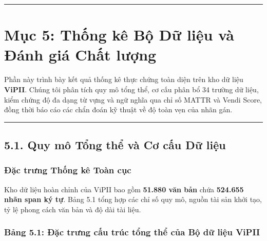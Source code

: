\documentclass[
  11pt,
  a4paper,
]{article}
\begin{document}
\begin{center}\rule{0.5\linewidth}{0.5pt}\end{center}

\section{Mục 5: Thống kê Bộ Dữ liệu và Đánh giá Chất
lượng}\label{mux1ee5c-5-thux1ed1ng-kuxea-bux1ed9-dux1eef-liux1ec7u-vuxe0-ux111uxe1nh-giuxe1-chux1ea5t-lux1b0ux1ee3ng}

Phần này trình bày kết quả thống kê thực chứng toàn diện trên kho dữ liệu \textbf{ViPII}. Chúng tôi
phân tích quy mô tổng thể, cơ cấu phân bổ 34 trường dữ liệu, kiểm chứng độ đa dạng từ vựng và ngữ
nghĩa qua chỉ số MATTR và Vendi Score, đồng thời báo cáo các chẩn đoán kỹ thuật về độ toàn vẹn của
nhãn gán.

\begin{center}\rule{0.5\linewidth}{0.5pt}\end{center}

\subsection{5.1. Quy mô Tổng thể và Cơ cấu Dữ
liệu}\label{quy-muxf4-tux1ed5ng-thux1ec3-vuxe0-cux1a1-cux1ea5u-dux1eef-liux1ec7u}

\subsubsection{Đặc trưng Thống kê Toàn
cục}\label{ux111ux1eb7c-trux1b0ng-thux1ed1ng-kuxea-touxe0n-cux1ee5c}

Kho dữ liệu hoàn chỉnh của ViPII bao gồm \textbf{51.880 văn bản} chứa \textbf{524.655 nhãn span ký
tự}. Bảng 5.1 tổng hợp các chỉ số quy mô, nguồn tài sản khởi tạo, tỷ lệ phong cách văn bản và độ dài
tài liệu.

\subsubsection{Bảng 5.1: Đặc trưng cấu trúc tổng thể của Bộ dữ liệu
ViPII}\label{bux1ea3ng-5.1-ux111ux1eb7c-trux1b0ng-cux1ea5u-truxfac-tux1ed5ng-thux1ec3-cux1ee7a-bux1ed9-dux1eef-liux1ec7u-vipii}
\end{document}

